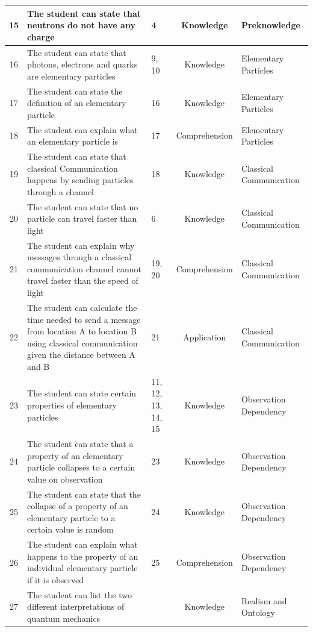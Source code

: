 \documentclass[11pt,twoside]{report} %
\begin{document}
\begin{table}[htbp]
\small
\begin{center}
\begin{tabular}{|c|p{5cm}|p{1.5cm}|c|p{3cm}|}
\hline
15 & The student can state that neutrons do not have any charge & 4 & Knowledge & Preknowledge \\ \hline
16 & The student can state that photons, electrons and quarks are elementary particles & 9, 10 & Knowledge & Elementary Particles \\ \hline
17 & The student can state the definition of an elementary particle & 16 & Knowledge & Elementary Particles \\ \hline
18 & The student can explain what an elementary particle is & 17 & Comprehension & Elementary Particles \\ \hline
19 & The student can state that classical Communication happens by sending particles through a channel & 18 & Knowledge & Classical Communication \\ \hline
20 & The student can state that no particle can travel faster than light & 6 & Knowledge & Classical Communication \\ \hline
21 & The student can explain why messages through a classical communication channel cannot travel faster than the speed of light & 19, 20 & Comprehension & Classical Communication \\ \hline
22 & The student can calculate the time needed to send a message from location A to location B using classical communication given the distance between A and B & 21 & Application & Classical Communication \\ \hline
23 & The student can state certain properties of elementary particles & 11, 12, 13, 14, 15 & Knowledge & Observation Dependency \\ \hline
24 & The student can state that a property of an elementary particle collapses to a certain value on observation & 23 & Knowledge & Observation Dependency \\ \hline
25 & The student can state that the collapse of a property of an elementary particle to a certain value is random & 24 & Knowledge & Observation Dependency \\ \hline
26 & The student can explain what happens to the property of an individual elementary particle if it is observed & 25 & Comprehension & Observation Dependency \\ \hline
27 & The student can list the two different interpretations of quantum mechanics &  & Knowledge & Realism and Ontology \\ \hline

\end{tabular}
\end{center}
\end{table}
\end{document}
